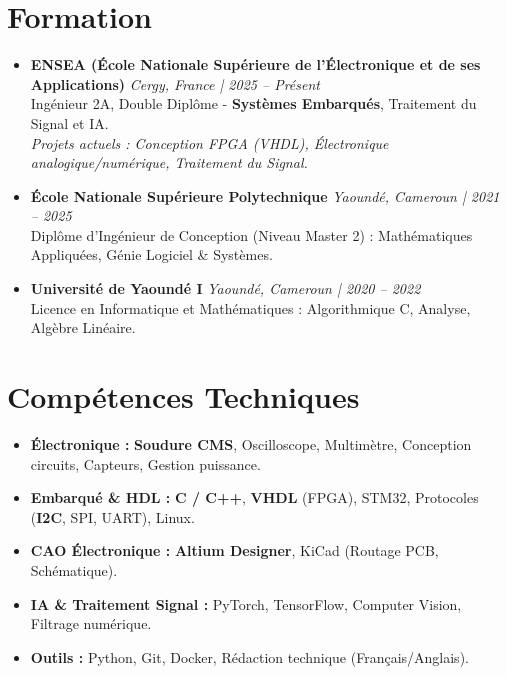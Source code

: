 \documentclass[a4paper,11pt]{article}
\begin{document}
\section{Formation}
\begin{itemize}[leftmargin=*, label={.}, nosep]
    \item \textbf{ENSEA (École Nationale Supérieure de l'Électronique et de ses Applications)} \hfill \textit{Cergy, France | 2025 -- Présent} \\
    \small{Ingénieur 2A, Double Diplôme - \textbf{Systèmes Embarqués}, Traitement du Signal et IA.} \\
    \textit{\small{Projets actuels : Conception FPGA (VHDL), Électronique analogique/numérique, Traitement du Signal.}}
    \vspace{2pt}
    \item \textbf{École Nationale Supérieure Polytechnique} \hfill \textit{Yaoundé, Cameroun | 2021 -- 2025} \\
    \small{Diplôme d'Ingénieur de Conception (Niveau Master 2) : Mathématiques Appliquées, Génie Logiciel \& Systèmes.}
    \item \textbf{Université de Yaoundé I} \hfill \textit{Yaoundé, Cameroun | 2020 -- 2022} \\
    \small{Licence en Informatique et Mathématiques : Algorithmique C, Analyse, Algèbre Linéaire.}
\end{itemize}

\section{Compétences Techniques}
\begin{itemize}[leftmargin=*, nosep]
    \item \small{\textbf{Électronique :} \textbf{Soudure CMS}, Oscilloscope, Multimètre, Conception circuits, Capteurs, Gestion puissance.}
    \item \small{\textbf{Embarqué \& HDL :} \textbf{C / C++}, \textbf{VHDL} (FPGA), STM32, Protocoles (\textbf{I2C}, SPI, UART), Linux.}
    \item \small{\textbf{CAO Électronique :} \textbf{Altium Designer}, KiCad (Routage PCB, Schématique).}
    \item \small{\textbf{IA \& Traitement Signal :} PyTorch, TensorFlow, Computer Vision, Filtrage numérique.}
    \item \small{\textbf{Outils :} Python, Git, Docker, Rédaction technique (Français/Anglais).}
\end{itemize}
\end{document}
